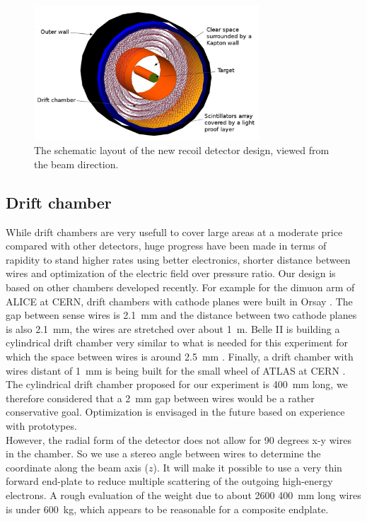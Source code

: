 \begin{figure}[ht!]
  \begin{center}
    \includegraphics[angle=0, width=0.75\textwidth]{./../Detector/fig-chap2/View_det_names.pdf}
    \caption{The schematic layout of the new recoil detector design, viewed from the beam direction.}
    \label{fig:new_lay}
  \end{center}
\end{figure}

\subsection{Drift chamber}

While drift chambers are very usefull to cover large areas at a moderate price compared with other detectors, huge progress have been made in terms of rapidity to stand higher rates using better electronics, shorter distance between wires and optimization of the electric field over pressure ratio. Our design is based on other chambers developed recently. For example for the dimuon arm of ALICE at CERN, drift chambers with cathode planes were built in Orsay \cite{AliceMuonArmChamber}. The gap between sense wires is 2.1~mm and the distance between two cathode planes is also 2.1~mm, the wires are stretched over about 1~m. Belle II is building a cylindrical drift chamber very similar to what is needed for this experiment for which the space between wires is around 2.5~mm \cite{BelleIItdr}. Finally, a drift chamber with wires distant of 1~mm is being built for the small wheel of ATLAS at CERN \cite{ATLASChamber}. The cylindrical drift chamber proposed for our experiment is 400~mm long, we therefore considered that a 2~mm gap between wires would be a rather conservative goal. Optimization is envisaged in the future based on experience with prototypes. \\

However, the radial form of the detector does not allow for 90 degrees x-y wires in the chamber. So we use a stereo angle between wires to determine the coordinate along the beam axis ($z$). It will make it possible to use a very thin forward end-plate to reduce multiple scattering of the outgoing high-energy electrons. A rough evaluation of the weight due to about 2600 400~mm long wires is under 600~kg, which appears to be reasonable for a composite endplate. \\

